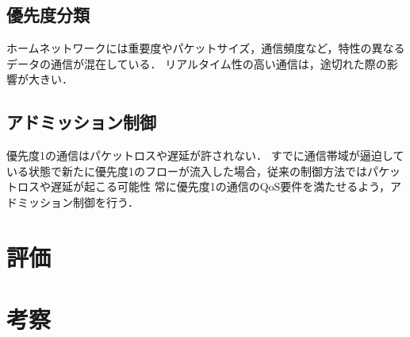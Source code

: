 \documentclass[a4paper,11pt,uplatex]{ujreport}
\begin{document}
\section{優先度分類}
\label{sec:優先度分類}

  ホームネットワークには重要度やパケットサイズ，通信頻度など，特性の異なるデータの通信が混在している．
  リアルタイム性の高い通信は，途切れた際の影響が大きい．

\section{アドミッション制御}
\label{sec:アドミッション制御}

  優先度1の通信はパケットロスや遅延が許されない．
  すでに通信帯域が逼迫している状態で新たに優先度1のフローが流入した場合，従来の制御方法ではパケットロスや遅延が起こる可能性
  常に優先度1の通信のQoS要件を満たせるよう，アドミッション制御を行う．







\chapter{評価}
\label{chap:評価}


\chapter{考察}
\label{chap:考察}
\end{document}
